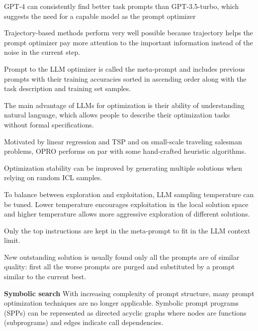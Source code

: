 GPT-4 can consistently find better task prompts than GPT-3.5-turbo, which suggests the need for a capable model as the prompt optimizer \cite{tang2024unleashingpotentiallargelanguage}

Trajectory-based methods perform very well possible because trajectory 
helps the prompt optimizer pay more attention to the important information instead of the noise in the current step. \cite{tang2024unleashingpotentiallargelanguage}



Prompt to the LLM optimizer is called the meta-prompt and includes previous prompts with their 
training accuracies sorted in ascending order along with the task description and training set samples. \cite{yang2024largelanguagemodelsoptimizers}

The main advantage of LLMs for optimization is their ability of understanding natural language, 
which allows people to describe their optimization tasks without formal specifications. \cite{yang2024largelanguagemodelsoptimizers}

Motivated by linear regression and TSP and on small-scale traveling salesman problems, OPRO performs on par with some hand-crafted heuristic algorithms. \cite{yang2024largelanguagemodelsoptimizers}

Optimization stability can be improved by generating multiple solutions when relying on random ICL samples. \cite{yang2024largelanguagemodelsoptimizers}

To balance between exploration and exploitation, LLM sampling temperature can be tuned. Lower temperature encourages exploitation in the local solution space and higher temperature allows more aggressive exploration of different solutions. \cite{yang2024largelanguagemodelsoptimizers}

Only the top instructions are kept in the meta-prompt to fit in the LLM context limit. \cite{yang2024largelanguagemodelsoptimizers}

New outstanding solution is usually found only all the prompts are of similar quality: first all the worse prompts are purged and substituted by a prompt similar to the current best. \cite{yang2024largelanguagemodelsoptimizers}






\textbf{Symbolic search}
With increasing complexity of prompt structure, many prompt optimization techniques are no longer applicable. \cite{schnabel2024symbolicpromptprogramsearch}
Symbolic prompt programs (SPPs) can be represented as directed acyclic graphs where nodes are functions (subprograms) and edges indicate call dependencies. \cite{schnabel2024symbolicpromptprogramsearch}

